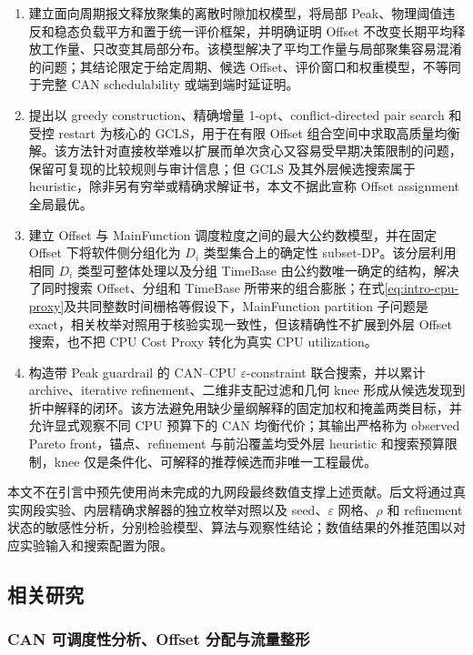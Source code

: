 \documentclass[UTF8,12pt,a4paper]{ctexart}
\begin{document}
\begin{enumerate}
  \item 建立面向周期报文释放聚集的离散时隙加权模型，将局部 Peak、物理阈值违反和稳态负载平方和置于统一评价框架，并明确证明 Offset 不改变长期平均释放工作量、只改变其局部分布。该模型解决了平均工作量与局部聚集容易混淆的问题；其结论限定于给定周期、候选 Offset、评价窗口和权重模型，不等同于完整 CAN schedulability 或端到端时延证明。

  \item 提出以 greedy construction、精确增量 1-opt、conflict-directed pair search 和受控 restart 为核心的 GCLS，用于在有限 Offset 组合空间中求取高质量均衡解。该方法针对直接枚举难以扩展而单次贪心又容易受早期决策限制的问题，保留可复现的比较规则与审计信息；但 GCLS 及其外层候选搜索属于 heuristic，除非另有穷举或精确求解证书，本文不据此宣称 Offset assignment 全局最优。

  \item 建立 Offset 与 MainFunction 调度粒度之间的最大公约数模型，并在固定 Offset 下将软件侧分组化为 $D_i$ 类型集合上的确定性 subset-DP。该分层利用相同 $D_i$ 类型可整体处理以及分组 TimeBase 由公约数唯一确定的结构，解决了同时搜索 Offset、分组和 TimeBase 所带来的组合膨胀；在式\eqref{eq:intro-cpu-proxy}及共同整数时间栅格等假设下，MainFunction partition 子问题是 exact，相关枚举对照用于核验实现一致性，但该精确性不扩展到外层 Offset 搜索，也不把 CPU Cost Proxy 转化为真实 CPU utilization。

  \item 构造带 Peak guardrail 的 CAN--CPU $\varepsilon$-constraint 联合搜索，并以累计 archive、iterative refinement、二维非支配过滤和几何 knee 形成从候选发现到折中解释的闭环。该方法避免用缺少量纲解释的固定加权和掩盖两类目标，并允许显式观察不同 CPU 预算下的 CAN 均衡代价；其输出严格称为 observed Pareto front，锚点、refinement 与前沿覆盖均受外层 heuristic 和搜索预算限制，knee 仅是条件化、可解释的推荐候选而非唯一工程最优。
\end{enumerate}

本文不在引言中预先使用尚未完成的九网段最终数值支撑上述贡献。后文将通过真实网段实验、内层精确求解器的独立枚举对照以及 seed、$\varepsilon$ 网格、$\rho$ 和 refinement 状态的敏感性分析，分别检验模型、算法与观察性结论；数值结果的外推范围以对应实验输入和搜索配置为限。

\subsection{相关研究}

\subsubsection{CAN 可调度性分析、Offset 分配与流量整形}
\end{document}
